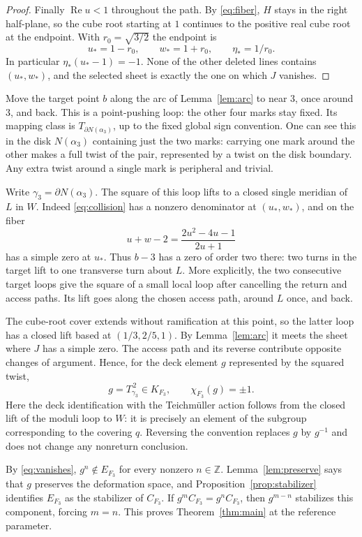\documentclass[11pt]{article}
\newcommand{\Z}{\mathbb Z}
\theoremstyle{remark}
\begin{document}
\begin{proof}
Finally $\operatorname{Re}u<1$ throughout the path. By \eqref{eq:fiber}, $H$ stays in the right half-plane, so the cube root starting at $1$ continues to the positive real cube root at the endpoint. With $r_0=\sqrt{3/2}$ the endpoint is
\[
 u_*=1-r_0,\qquad w_*=1+r_0,\qquad \eta_*=1/r_0.
\]
In particular $\eta_*(u_*-1)=-1$. None of the other deleted lines contains $(u_*,w_*)$, and the selected sheet is exactly the one on which $J$ vanishes.
\end{proof}

Move the target point $b$ along the arc of Lemma~\ref{lem:arc} to near $3$, once around $3$, and back. This is a point-pushing loop: the other four marks stay fixed. Its mapping class is $T_{\partial N(\alpha_3)}$, up to the fixed global sign convention. One can see this in the disk $N(\alpha_3)$ containing just the two marks: carrying one mark around the other makes a full twist of the pair, represented by a twist on the disk boundary. Any extra twist around a single mark is peripheral and trivial.

Write $\gamma_3=\partial N(\alpha_3)$. The square of this loop lifts to a closed single meridian of $L$ in $W$. Indeed \eqref{eq:collision} has a nonzero denominator at $(u_*,w_*)$, and on the fiber
\[
 u+w-2=\frac{2u^2-4u-1}{2u+1}
\]
has a simple zero at $u_*$. Thus $b-3$ has a zero of order two there: two turns in the target lift to one transverse turn about $L$. More explicitly, the two consecutive target loops give the square of a small local loop after cancelling the return and access paths. Its lift goes along the chosen access path, around $L$ once, and back.

The cube-root cover extends without ramification at this point, so the latter loop has a closed lift based at $(1/3,2/5,1)$. By Lemma~\ref{lem:arc} it meets the sheet where $J$ has a simple zero. The access path and its reverse contribute opposite changes of argument. Hence, for the deck element $g$ represented by the squared twist,
\begin{equation}\label{eq:chi}
 g=T_{\gamma_3}^{\,2}\in K_{F_3},\qquad
 \chi_{F_3}(g)=\pm1.
\end{equation}
Here the deck identification with the Teichm\"uller action follows from the closed lift of the moduli loop to $W$: it is precisely an element of the subgroup corresponding to the covering $q$. Reversing the convention replaces $g$ by $g^{-1}$ and does not change any nonreturn conclusion.

By \eqref{eq:vanishes}, $g^n\notin E_{F_3}$ for every nonzero $n\in\Z$. Lemma~\ref{lem:preserve} says that $g$ preserves the deformation space, and Proposition~\ref{prop:stabilizer} identifies $E_{F_3}$ as the stabilizer of $C_{F_3}$. If $g^mC_{F_3}=g^nC_{F_3}$, then $g^{m-n}$ stabilizes this component, forcing $m=n$. This proves Theorem~\ref{thm:main} at the reference parameter.
\end{document}
